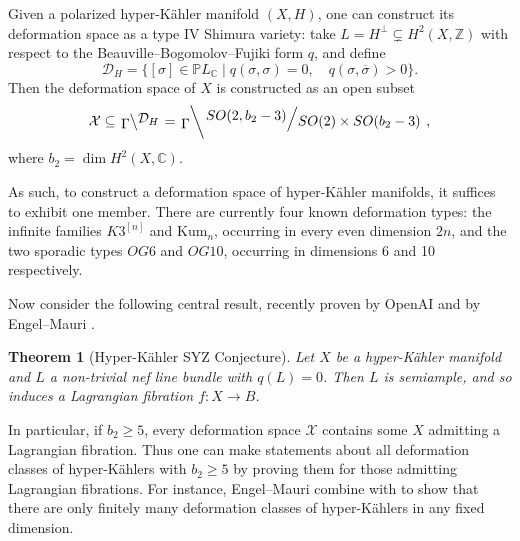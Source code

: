 \documentclass[12pt]{amsart}
\newcommand{\C}{\mathbb{C}}
\newcommand{\Z}{\mathbb{Z}}
\newcommand{\bbP}{\mathbb{P}}
\newcommand{\ol}{\overline}
\newcommand{\rightQ}[2]{\left.\raisebox{.2em}{$#1$}\middle/\raisebox{-.2em}{$#2$}\right.}
\newcommand{\leftQ}[2]{\left.\raisebox{-.2em}{$#2$}\middle\backslash\raisebox{.2em}{$#1$}\right.}
\newtheorem{theorem}{Theorem}[section]
\theoremstyle{definition}
\numberwithin{equation}{section}
\begin{document}
Given a polarized hyper-K\"ahler manifold \((X, H)\), one can construct its deformation 
space as a type IV Shimura variety: take \(L = H^\perp \subsetneq H^2(X, \Z)\) with 
respect to the Beauville--Bogomolov--Fujiki form \(q\), and define 
\[\mathcal{D}_H = \{[\sigma] \in \bbP L_\C \mid q(\sigma, \sigma) = 0, \quad
q(\sigma, \ol\sigma) > 0\}.\]
Then the deformation space of \(X\) is constructed as an open subset 
\begin{equation*}
    \mathcal{X} \subseteq \leftQ{\mathcal{D}_H}{\Gamma} = 
    \leftQ{\rightQ{SO(2, b_2-3)}{SO(2) \times SO(b_2-3)}}{\Gamma},
\end{equation*}
where \(b_2 = \dim H^2(X, \C)\).

As such, to construct a deformation space of hyper-K\"ahler manifolds, it suffices 
to exhibit one member. There are currently four known deformation types: the infinite 
families \(K3^{[n]}\) and \(\mathrm{Kum}_n\), occurring in every even dimension \(2n\),
and the two sporadic types \(OG6\) and \(OG10\), occurring in dimensions 6 and 10 
respectively. 

Now consider the following central result, recently proven by OpenAI
\cite{openai-syz} and by Engel--Mauri \cite{engel-mauri26}.
\begin{theorem}[Hyper-K\"ahler SYZ Conjecture] \label{theorem-syz}
    Let \(X\) be a hyper-K\"ahler manifold and \(L\) a non-trivial nef line bundle
    with \(q(L) = 0\). Then \(L\) is semiample, and so induces a Lagrangian
    fibration \(f: X \to B\).
\end{theorem}
In particular, if \(b_2 \geq 5\), every deformation space \(\mathcal{X}\) contains
some \(X\) admitting a Lagrangian fibration. 
Thus one can make statements about all deformation classes of hyper-K\"ahlers
with \(b_2 \geq 5\) by proving them for those admitting Lagrangian fibrations.
For instance, Engel--Mauri combine  with \cite{engel25} to show
that there are only finitely many deformation classes of hyper-K\"ahlers in any
fixed dimension.
\end{document}
